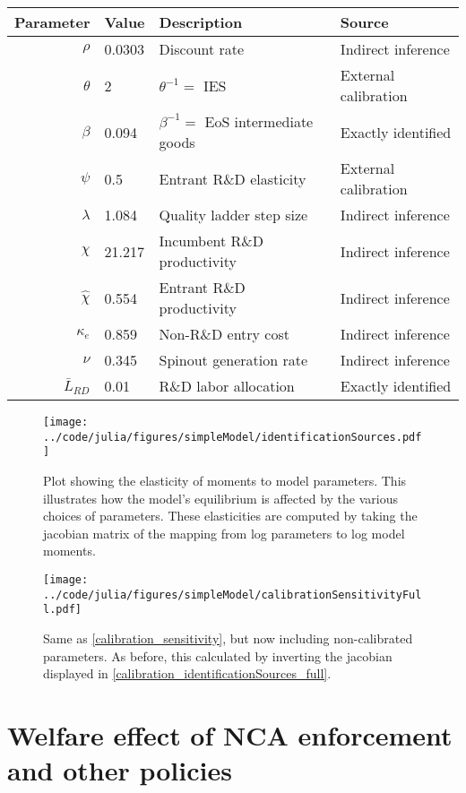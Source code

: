 \documentclass[11pt,english]{article}
\begin{document}
\begin{table}[]
	\centering
	\label{calibration_parameters}
	\begin{tabular}{rlll}
		\toprule \toprule
		Parameter & Value & Description & Source \tabularnewline
		\midrule
		$\rho$ & 0.0303 & Discount rate  & Indirect inference \tabularnewline
		$\theta$ & 2 & $\theta^{-1} = $ IES & External calibration 
		\tabularnewline
		$\beta$ & 0.094 & $\beta^{-1} = $ EoS intermediate goods & Exactly identified \tabularnewline 
		$\psi$ & 0.5 & Entrant R\&D elasticity & External calibration \tabularnewline
		$\lambda$ & 1.084 & Quality ladder step size & Indirect inference 
		\tabularnewline
		$\chi$ & 21.217 & Incumbent R\&D productivity & Indirect inference 
		\tabularnewline
		$\hat{\chi}$ & 0.554 & Entrant R\&D productivity & Indirect inference \tabularnewline 
		$\kappa_e$ & 0.859 & Non-R\&D entry cost & Indirect inference \tabularnewline
		$\nu$ & 0.345 & Spinout generation rate  & Indirect inference\tabularnewline
		$\bar{L}_{RD}$ & 0.01 & R\&D labor allocation  & Exactly identified \tabularnewline
		\bottomrule
	\end{tabular}
\end{table}

\begin{figure}[]
	\texttt{[image: ../code/julia/figures/simpleModel/identificationSources.pdf]}
	\caption{Plot showing the elasticity of moments to model parameters. This illustrates how the model's equilibrium is affected by the various choices of parameters. These elasticities are computed by taking the jacobian matrix of the mapping from log parameters to log model moments.}
	\label{calibration_identificationSources}
\end{figure}

\begin{figure}[]
	\texttt{[image: ../code/julia/figures/simpleModel/calibrationSensitivityFull.pdf]}
	\caption{Same as \autoref{calibration_sensitivity}, but now including non-calibrated parameters. As before, this calculated by inverting the jacobian displayed in \autoref{calibration_identificationSources_full}.}
	\label{calibration_sensitivity_full}
\end{figure}

\section{Welfare effect of NCA enforcement and other policies}\label{sec:policy_analysis}
\end{document}

